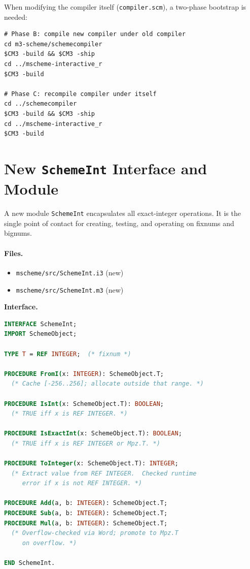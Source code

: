 \documentclass[12pt]{article}
\begin{document}
When modifying the compiler itself ({\tt compiler.scm}), a
two-phase bootstrap is needed:

\begin{lstlisting}[language={}]
# Phase B: compile new compiler under old compiler
cd m3-scheme/schemecompiler
$CM3 -build && $CM3 -ship
cd ../mscheme-interactive_r
$CM3 -build

# Phase C: recompile compiler under itself
cd ../schemecompiler
$CM3 -build && $CM3 -ship
cd ../mscheme-interactive_r
$CM3 -build
\end{lstlisting}

\section{New {\tt SchemeInt} Interface and Module}
\label{sec:impl-schemeint}

A new module {\tt SchemeInt} encapsulates all exact-integer
operations.  It is the single point of contact for creating,
testing, and operating on fixnums and bignums.

\paragraph{Files.}
\begin{itemize}[nosep]
\item {\tt mscheme/src/SchemeInt.i3} (new)
\item {\tt mscheme/src/SchemeInt.m3} (new)
\end{itemize}

\medskip\noindent\textbf{Interface.}
\begin{lstlisting}[language=Modula3]
INTERFACE SchemeInt;
IMPORT SchemeObject;

TYPE T = REF INTEGER;  (* fixnum *)

PROCEDURE FromI(x: INTEGER): SchemeObject.T;
  (* Cache [-256..256]; allocate outside that range. *)

PROCEDURE IsInt(x: SchemeObject.T): BOOLEAN;
  (* TRUE iff x is REF INTEGER. *)

PROCEDURE IsExactInt(x: SchemeObject.T): BOOLEAN;
  (* TRUE iff x is REF INTEGER or Mpz.T. *)

PROCEDURE ToInteger(x: SchemeObject.T): INTEGER;
  (* Extract value from REF INTEGER.  Checked runtime
     error if x is not REF INTEGER. *)

PROCEDURE Add(a, b: INTEGER): SchemeObject.T;
PROCEDURE Sub(a, b: INTEGER): SchemeObject.T;
PROCEDURE Mul(a, b: INTEGER): SchemeObject.T;
  (* Overflow-checked via Word; promote to Mpz.T
     on overflow. *)

END SchemeInt.
\end{lstlisting}
\end{document}
